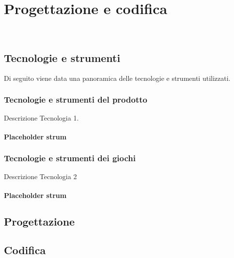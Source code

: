 \chapter{Progettazione e codifica}
\label{cap:progettazione-codifica}

\\

\section{Tecnologie e strumenti}
\label{sec:tecnologie-strumenti}

Di seguito viene data una panoramica delle tecnologie e strumenti utilizzati.

\subsection{Tecnologie e strumenti del prodotto}
Descrizione Tecnologia 1.

\subsubsection{Placeholder strum}

\subsection{Tecnologie e strumenti dei giochi}
Descrizione Tecnologia 2

\subsubsection{Placeholder strum}

\section{Progettazione}
\label{sec:progettazione}


\section{Codifica}
